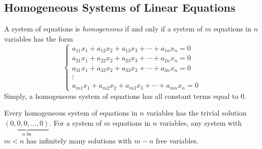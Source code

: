 \subsection{Homogeneous Systems of Linear Equations}
\begin{definition}\label{def:3}
	A system of equations is \emph{homogeneous} if and only if a system of $m$ equations in $n$ variables has the form
	$$\left\{
	\begin{array}{c}
		a_{11}x_1+a_{12}x_2+a_{13}x_3+\cdots+a_{1n}x_n=0\\
		a_{21}x_1+a_{22}x_2+a_{23}x_3+\cdots+a_{2n}x_n=0\\
		a_{31}x_1+a_{32}x_2+a_{33}x_3+\cdots+a_{3n}x_n=0\\
		\vdots\\
		a_{m1}x_1+a_{m2}x_2+a_{m3}x_3+\cdots+a_{mn}x_n=0
	\end{array}
	\right.$$
	Simply, a homogeneous system of equations has all constant terms equal to 0.
\end{definition}
\begin{corollary}\label{cor:2}
	Every homogeneous system of equations in $n$ variables has the trivial solution $\underbrace{(0,0,0,\ldots,0)}_{n\;\text{0s}}$. For a system of $m$ equations in $n$ variables, any system with $m<n$ has infinitely many solutions with $m-n$ free variables.
\end{corollary}
